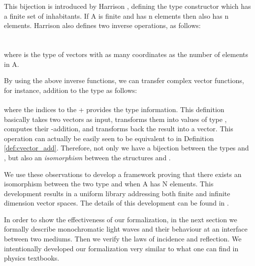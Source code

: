 \documentclass{llncs}
\begin{document}
{		This bijection is introduced by Harrison \cite{harrison_13hol}, defining the type
		constructor  which has a finite
		set of inhabitants. If \hol A is finite and has
		\hol n elements then  also has \hol n elements.
		Harrison also defines two inverse operations, as follows:\vspace{.2cm}\\
		 \vspace{.1cm}\\
		\vspace{.2cm}\\
    where  is the type of vectors with as many coordinates as the number of elements in \hol A. 
		
		By using the above inverse functions, we can transfer complex vector functions, for instance,  addition
		to the type  as follows: \vspace{.2cm}\\
    \vspace{.2cm}\\
    \noindent where the indices to the \hol + provides the type information. 
		This definition basically takes two vectors as input, transforms them into values
		of type , computes their -addition, and transforms back
		the result into a vector.
		This operation can actually be easily seen to be equivalent to  in Definition \ref{def:cvector_add}.
		Therefore, not only we have a bijection between
		the types  and ,
		but also an \emph{isomorphism} between the structures
		 and .
		

We use these observations to develop a framework proving that there exists an isomorphism between the two type  and  when \hol A has \hol N elements. This development results in a uniform library addressing both finite and infinite dimension vector spaces. The details of this development can be found in \cite{report_MCS}. 




In order to show the effectiveness of our formalization, in the next section we formally describe monochromatic light waves and their behaviour at an interface between two mediums. Then we verify the laws of incidence and reflection. We intentionally developed our formalization very similar to what one can find in physics textbooks. 

}
\end{document}
